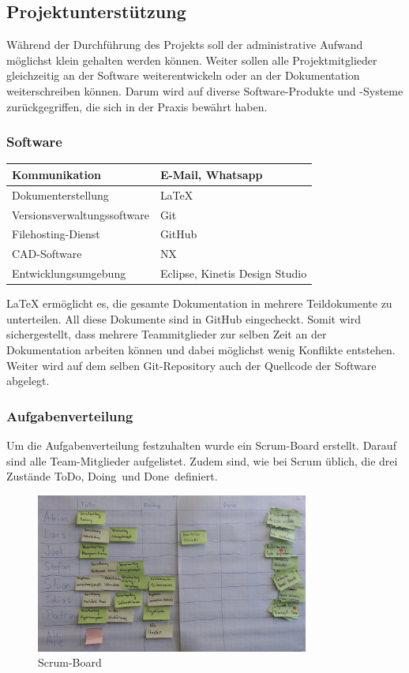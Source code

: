 \subsection{Projektunterstützung}
Während der Durchführung des Projekts soll der administrative Aufwand möglichst klein gehalten werden können. Weiter sollen alle Projektmitglieder gleichzeitig an der Software weiterentwickeln oder an der Dokumentation weiterschreiben können. Darum wird auf diverse Software-Produkte und -Systeme zurückgegriffen, die sich in der Praxis bewährt haben.
%
\subsubsection{Software}
\begin{table}[H]
\begin{tabular}{|p{}|p{}|}\hline
%	
Kommunikation	&	E-Mail, Whatsapp \\\hline
Dokumenterstellung & LaTeX\\\hline
Versionsverwaltungssoftware & Git \\\hline
Filehosting-Dienst & GitHub \\\hline
CAD-Software & NX\\\hline
Entwicklungsumgebung	& Eclipse, Kinetis Design Studio \\\hline
%
\end{tabular}
\end{table}
LaTeX ermöglicht es, die gesamte Dokumentation in mehrere Teildokumente zu unterteilen. All diese Dokumente sind in GitHub eingecheckt. Somit wird sichergestellt, dass mehrere Teammitglieder zur selben Zeit an der Dokumentation arbeiten können und dabei möglichst wenig Konflikte entstehen. Weiter wird auf dem selben Git-Repository auch der Quellcode der Software abgelegt. \\
\subsubsection{Aufgabenverteilung}
Um die Aufgabenverteilung festzuhalten wurde ein Scrum-Board erstellt. Darauf sind alle Team-Mitglieder aufgelistet. Zudem sind, wie bei Scrum üblich, die drei Zustände \glqq ToDo\grqq, \glqq Doing\grqq \ und \glqq Done\grqq \ definiert.
\begin{figure}[H]%
\centering
\includegraphics[width=0.8\textwidth]{04_Projektmanagement/fig/scrumBoard.jpg}
\caption{Scrum-Board}
\label{fig:scrumBoard}
\end{figure}